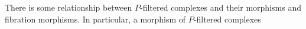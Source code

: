 %
%
%
%



There is some relationship between $P$-filtered complexes and their morphisms and fibration morphisms.  In particular, a morphism of $P$-filtered complexes 



%
%



%
%











 
